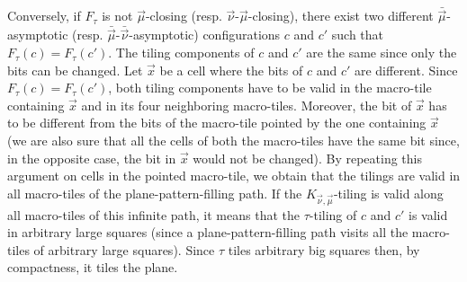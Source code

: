\documentclass{llncs}
\newcommand{\nn}{\vec\nu}
\newcommand{\mm}{\vec \mu}
\newcommand{\xx}{\vec x}
\begin{document}
Conversely, if $F_{\tau}$ is not $\mm$-closing (resp. $\nn$-$\mm$-closing), there exist two different $\bar{\mm}$-asymptotic (resp. $\bar{\mm}$-$\bar{\nn}$-asymptotic)
configurations
$c$ and $c'$
such that $F_{\tau}(c)=F_{\tau}(c')$. The tiling components
of $c$ and $c'$ are the same since only the bits can be changed.
Let $\xx$ be a cell where the bits of $c$ and $c'$ are different.
Since $F_{\tau}(c)=F_{\tau}(c')$, both tiling components have to be valid in the
macro-tile containing $\xx$ and in its four neighboring macro-tiles. Moreover, 
the bit of $\xx$ has to be different from the bits of the macro-tile pointed by the
one containing $\xx$ (we are also sure that all the cells of both the macro-tiles
have the same bit since, in the opposite case, the bit in $\xx$ would not be changed). By repeating this argument on cells in the pointed macro-tile, we obtain that the tilings are valid in all macro-tiles of the plane-pattern-filling path.
 If the
$K_{\nn,\mm}$-tiling is valid along all macro-tiles of this infinite path, it means
that the $\tau$-tiling of $c$ and $c'$ is valid in arbitrary large squares (since a plane-pattern-filling
path visits all the macro-tiles of arbitrary large squares). 
Since $\tau$ tiles arbitrary big squares then, by compactness, it
tiles the plane. 
\end{document}
